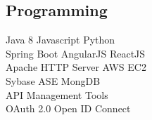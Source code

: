 \documentclass[]{deedy-resume-openfont}
\begin{document}
\begin{minipage}[t]{0.33\textwidth}
\subsection{Programming}
Java 8 \textbullet{} Javascript \textbullet{} Python \\
\textbullet{} Spring Boot \textbullet{} AngularJS \textbullet{} ReactJS \\
Apache HTTP Server \textbullet{} AWS EC2 \\
Sybase ASE \textbullet{} MongDB \\
API Management Tools \\
OAuth 2.0 \textbullet{} Open ID Connect \\
\sectionsep

%
%

\end{minipage} 
\hfill
\end{document}
